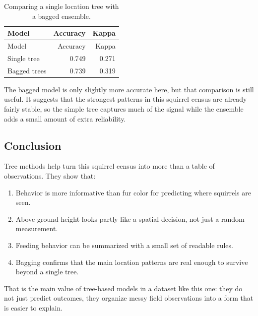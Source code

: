 \documentclass[
  11pt,
]{article}
\providecommand{\tightlist}{%
  \setlength{\itemsep}{0pt}\setlength{\parskip}{0pt}}
\begin{document}
\begin{longtable}[]{@{}lrr@{}}
\caption{Comparing a single location tree with a bagged
ensemble.}\tabularnewline
\toprule\noalign{}
Model & Accuracy & Kappa \\
\midrule\noalign{}
\endfirsthead
\toprule\noalign{}
Model & Accuracy & Kappa \\
\midrule\noalign{}
\endhead
\bottomrule\noalign{}
\endlastfoot
Single tree & 0.749 & 0.271 \\
Bagged trees & 0.739 & 0.319 \\
\end{longtable}

The bagged model is only slightly more accurate here, but that
comparison is still useful. It suggests that the strongest patterns in
this squirrel census are already fairly stable, so the simple tree
captures much of the signal while the ensemble adds a small amount of
extra reliability.

\subsection{Conclusion}\label{conclusion}

Tree methods help turn this squirrel census into more than a table of
observations. They show that:

\begin{enumerate}
\def\labelenumi{\arabic{enumi}.}
\tightlist
\item
  Behavior is more informative than fur color for predicting where
  squirrels are seen.
\item
  Above-ground height looks partly like a spatial decision, not just a
  random measurement.
\item
  Feeding behavior can be summarized with a small set of readable rules.
\item
  Bagging confirms that the main location patterns are real enough to
  survive beyond a single tree.
\end{enumerate}

That is the main value of tree-based models in a dataset like this one:
they do not just predict outcomes, they organize messy field
observations into a form that is easier to explain.
\end{document}
